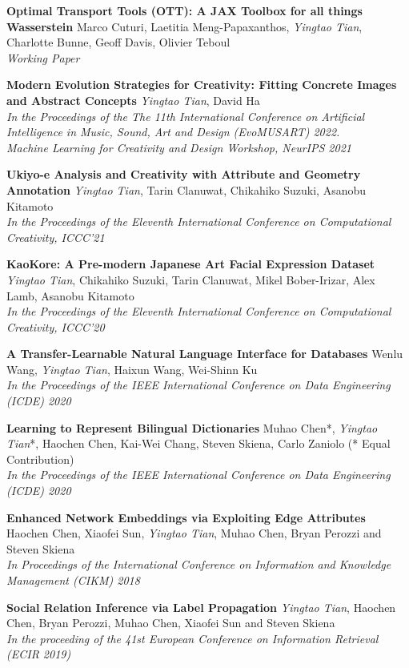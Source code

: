 \documentclass[line,margin]{cv}
\begin{document}
\begin{resume}
  {\bf Optimal Transport Tools (OTT): A JAX Toolbox for all things Wasserstein}
  Marco Cuturi, Laetitia Meng-Papaxanthos, \emph{Yingtao Tian}, Charlotte Bunne, Geoff Davis, Olivier Teboul\\
  \emph{Working Paper}

  {\bf Modern Evolution Strategies for Creativity: Fitting Concrete Images and Abstract Concepts}
  \emph{Yingtao Tian}, David Ha\\
  \emph{In the Proceedings of the The 11th International Conference on Artificial Intelligence in Music, Sound, Art and Design (EvoMUSART) 2022.\\
  Machine Learning for Creativity and Design Workshop, NeurIPS 2021}

  {\bf  Ukiyo-e Analysis and Creativity with Attribute and Geometry Annotation}
  \emph{Yingtao Tian}, Tarin Clanuwat, Chikahiko Suzuki, Asanobu Kitamoto\\
  \emph{In the Proceedings of the Eleventh International Conference on Computational Creativity, ICCC'21}

  {\bf  KaoKore: A Pre-modern Japanese Art Facial Expression Dataset}
  \emph{Yingtao Tian}, Chikahiko Suzuki, Tarin Clanuwat, Mikel Bober-Irizar, Alex Lamb, Asanobu Kitamoto\\
  \emph{In the Proceedings of the Eleventh International Conference on Computational Creativity, ICCC'20}

  {\bf  A Transfer-Learnable Natural Language Interface for Databases}
  Wenlu Wang, \emph{Yingtao Tian}, Haixun Wang, Wei-Shinn Ku\\
  \emph{In the Proceedings of the IEEE International Conference on Data Engineering (ICDE) 2020}
  
  {\bf  Learning to Represent Bilingual Dictionaries}
  Muhao Chen*, \emph{Yingtao Tian}*, Haochen Chen, Kai-Wei Chang, Steven Skiena, Carlo Zaniolo  (* Equal Contribution)\\
  \emph{In the Proceedings of the IEEE International Conference on Data Engineering (ICDE) 2020}
  
  {\bf  Enhanced Network Embeddings via Exploiting Edge Attributes}
   Haochen Chen, Xiaofei Sun, \emph{Yingtao Tian}, Muhao Chen, Bryan Perozzi and Steven Skiena\\
  \emph{In Proceedings of the International Conference on Information and Knowledge Management (CIKM) 2018}

  {\bf Social Relation Inference via Label Propagation}
  \emph{Yingtao Tian}, Haochen Chen, Bryan Perozzi, Muhao Chen, Xiaofei Sun and Steven Skiena\\
  \emph{In the proceeding of the 41st European Conference on Information Retrieval (ECIR 2019)}
  

\end{resume}
\end{document}
